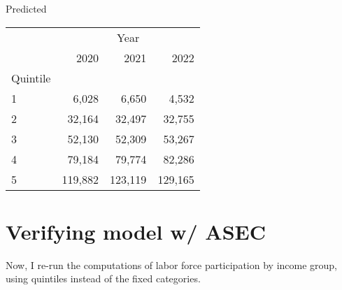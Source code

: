 \documentclass{article}
\begin{document}
	\begin{minipage}[b]{.40\textwidth}
		\centering
		Predicted	
		\begin{tabular}{llll}
			\cline{1-4}
			\multicolumn{1}{c}{} &
			\multicolumn{3}{|c}{Year} \\
			\multicolumn{1}{c}{} &
			\multicolumn{1}{|r}{2020} &
			\multicolumn{1}{r}{2021} &
			\multicolumn{1}{r}{2022} \\
			\cline{1-4}
			\multicolumn{1}{l}{Quintile} &
			\multicolumn{1}{|r}{} &
			\multicolumn{1}{r}{} &
			\multicolumn{1}{r}{} \\
			\multicolumn{1}{l}{\hspace{1em}1} &
			\multicolumn{1}{|r}{6,028} &
			\multicolumn{1}{r}{6,650} &
			\multicolumn{1}{r}{4,532} \\
			\multicolumn{1}{l}{\hspace{1em}2} &
			\multicolumn{1}{|r}{32,164} &
			\multicolumn{1}{r}{32,497} &
			\multicolumn{1}{r}{32,755} \\
			\multicolumn{1}{l}{\hspace{1em}3} &
			\multicolumn{1}{|r}{52,130} &
			\multicolumn{1}{r}{52,309} &
			\multicolumn{1}{r}{53,267} \\
			\multicolumn{1}{l}{\hspace{1em}4} &
			\multicolumn{1}{|r}{79,184} &
			\multicolumn{1}{r}{79,774} &
			\multicolumn{1}{r}{82,286} \\
			\multicolumn{1}{l}{\hspace{1em}5} &
			\multicolumn{1}{|r}{119,882} &
			\multicolumn{1}{r}{123,119} &
			\multicolumn{1}{r}{129,165} \\
			\cline{1-4}
		\end{tabular}
	\end{minipage}
	
	
	\section{Verifying model w/ ASEC}
	
	Now, I re-run the computations of labor force participation by income group, using quintiles instead of the fixed categories.         
\end{document}
